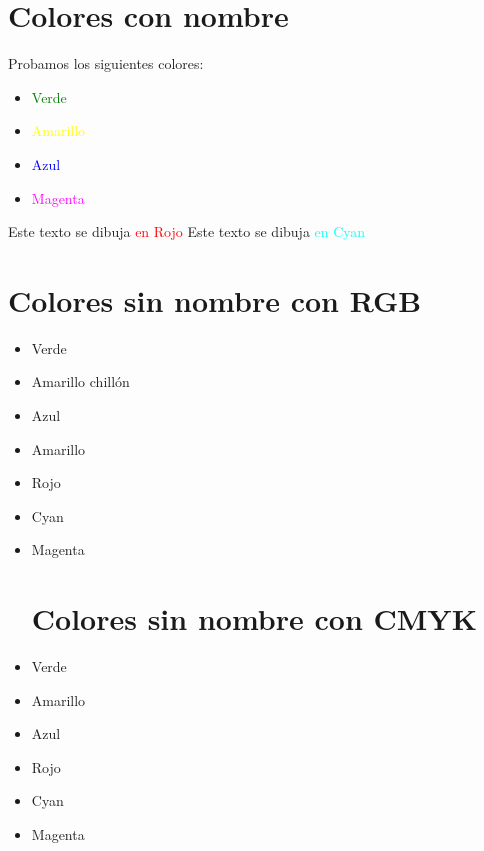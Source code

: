 \documentclass[10pt,a4paper]{article}
\author{David Parra Auñón}
\begin{document}
\section{Colores con nombre}
Probamos los siguientes colores:
\begin{itemize}
\item \textcolor{green}{Verde}
\item \textcolor{yellow}{Amarillo}
\item \textcolor{blue}{Azul}
\item \textcolor{magenta}{Magenta}
\end{itemize}
Este texto se dibuja \textcolor{red}{en Rojo}
Este texto se dibuja \textcolor{cyan}{en Cyan}
\section{Colores sin nombre con RGB}
\begin{itemize}
\item \textcolor[rgb]{0,1,0}{Verde}
\item \textcolor[rgb]{0.7,0.7,0}{Amarillo chillón}
\item \textcolor[rgb]{0,0,1}{Azul}
\item \textcolor[rgb]{1,1,0}{Amarillo}
\item \textcolor[rgb]{1,0,0}{Rojo}
\item \textcolor[rgb]{0,0.5,1}{Cyan}
\item \textcolor[rgb]{1,0,0.5}{Magenta}
\section{Colores sin nombre con CMYK}
\item \textcolor[cmyk]{1,0,1,0}{Verde}
\item \textcolor[cmyk]{0,0,1,0}{Amarillo}
\item \textcolor[cmyk]{1,1,0,0}{Azul}
\item \textcolor[cmyk]{0,1,1,0}{Rojo}
\item \textcolor[cmyk]{1,0,0,0}{Cyan}
\item \textcolor[cmyk]{0,1,0,0}{Magenta}
\end{itemize}
\end{document}
